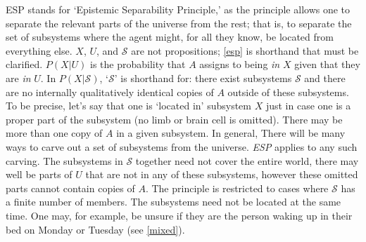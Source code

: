 \documentclass[onecolumn,secnumarabic,amsmath,amssymb,balancelastpage,nofootinbib]{article}
\begin{document}
ESP stands for `Epistemic Separability Principle,' as the principle allows one to separate the relevant parts of the universe from the rest; that is, to separate the set of subsystems where the agent might, for all they know, be located from everything else. $X$, $U$, and $\mathcal{S}$ are not propositions; \eqref{esp} is shorthand that must be clarified.  $P(X|U)$ is the probability that $A$ assigns to being \emph{in} $X$ given that they are \emph{in} $U$.  In $P(X|\mathcal{S})$, `$\mathcal{S}$' is shorthand for: there exist subsystems $\mathcal{S}$ and there are no internally qualitatively identical copies of $A$ outside of these subsystems.  To be precise, let's say that one is `located in' subsystem $X$ just in case one is a proper part of the subsystem (no limb or brain cell is omitted).  There may be more than one copy of $A$ in a given subsystem.  In general, There will be many ways to carve out a set of subsystems from the universe.  \emph{ESP} applies to any such carving.  The subsystems in $\mathcal{S}$ together need not cover the entire world, there may well be parts of $U$ that are not in any of these subsystems, however these omitted parts cannot contain copies of $A$.  The principle is restricted to cases where $\mathcal{S}$ has a finite number of members.  The subsystems need not be located at the same time.  One may, for example, be unsure if they are the person waking up in their bed on Monday or Tuesday (see \textsection \ref{mixed}).  
\end{document}
